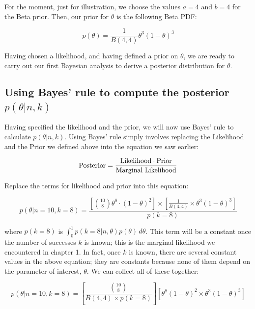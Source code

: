 \documentclass[12pt,]{krantz}
\theoremstyle{definition}
\theoremstyle{definition}
\theoremstyle{definition}
\theoremstyle{remark}
\begin{document}
For the moment, just for illustration, we choose the values \(a=4\) and
\(b=4\) for the Beta prior. Then, our prior for \(\theta\) is the
following Beta PDF:

\begin{equation}
p(\theta) = \frac{1}{B(4,4)} \theta^{3} (1-\theta)^{3}
\end{equation}

Having chosen a likelihood, and having defined a prior on \(\theta\), we
are ready to carry out our first Bayesian analysis to derive a posterior
distribution for \(\theta\).

\subsection{\texorpdfstring{Using Bayes' rule to compute the posterior
\(p(\theta|n,k)\)}{Using Bayes' rule to compute the posterior p(\textbackslash{}theta\textbar{}n,k)}}\label{using-bayes-rule-to-compute-the-posterior-pthetank}

Having specified the likelihood and the prior, we will now use Bayes'
rule to calculate \(p(\theta|n,k)\). Using Bayes' rule simply involves
replacing the Likelihood and the Prior we defined above into the
equation we saw earlier:

\begin{equation}
\hbox{Posterior} = \frac{\hbox{Likelihood} \cdot \hbox{Prior}}{\hbox{Marginal Likelihood}}
\end{equation}

Replace the terms for likelihood and prior into this equation:

\begin{equation}
p(\theta|n=10,k=8) = \frac{\left[\binom{10}{8} \theta^8 \cdot (1-\theta)^{2}\right]  \times \left[\frac{1}{B(4,4)} \times \theta^{3} (1-\theta)^{3}\right]}{p(k=8)}
\label{eq:betaunpost}
\end{equation}

where \(p(k=8)\) is \(\int_{0}^1 p(k=8|n,\theta) p(\theta)\, d\theta\).
This term will be a constant once the number of successes \(k\) is
known; this is the marginal likelihood we encountered in chapter 1. In
fact, once \(k\) is known, there are several constant values in the
above equation; they are constants because none of them depend on the
parameter of interest, \(\theta\). We can collect all of these together:

\begin{equation}
p(\theta|n=10,k=8) =   \left[ \frac{\binom{10}{8}}{B(4,4)\times p(k=8)} \right]   [\theta^8 (1-\theta)^{2} \times  \theta^{3} (1-\theta)^{3}]
\label{eq:betaunpost2}
\end{equation}
\end{document}
